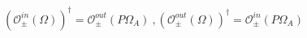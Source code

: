 \begin{equation}\label{CFTherm}
(\mathcal{O}^{in}_{\pm}(\Omega))^{\dag}=
\mathcal{O}^{out}_{\pm}(P\Omega_A) \ ,
(\mathcal{O}^{out}_{\pm}(\Omega))^{\dag}=
\mathcal{O}^{in}_{\pm}(P\Omega_A)
\end{equation}

